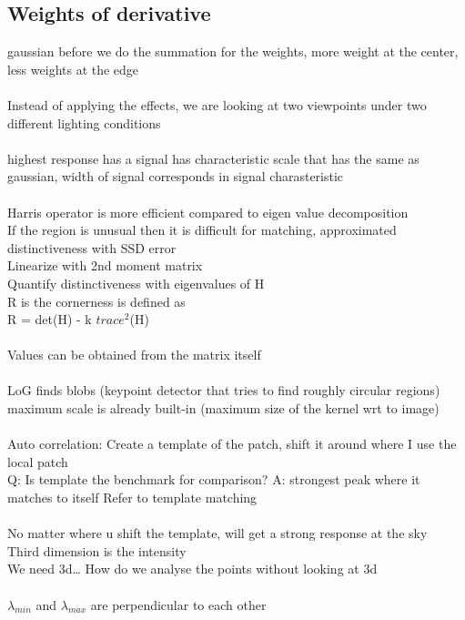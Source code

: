 \documentclass[11pt]{article}
\begin{document}
\subsection*{Weights of derivative}
gaussian before we do the summation for the weights, more weight at the center, less weights at the edge
\\
\\
Instead of applying the effects, we are looking at two viewpoints under two different lighting conditions
\\\\
highest response has a signal has characteristic scale that has the same as gaussian, width of signal corresponds in signal charasteristic
	\\\\
	Harris operator is more efficient compared to eigen value decomposition\\
	If the region is unusual then it is difficult for matching, approximated distinctiveness with SSD error
	\\
	Linearize with 2nd moment matrix\\
	Quantify distinctiveness with eigenvalues of H 
	\\
	R is the cornerness is defined as \\
	R = det(H) - k $trace^{2}$(H)
	\\\\
	Values can be obtained from the matrix itself
	\\\\
LoG finds blobs (keypoint detector that tries to find roughly circular regions)
maximum scale is already built-in
(maximum size of the kernel wrt to image)
\\\\
Auto correlation: Create a template of the patch, shift it around where I use the local patch
\\
Q: Is template the benchmark for comparison?
A: strongest peak where it matches to itself
Refer to template matching\\
\\
No matter where u shift the template, will get a strong response at the sky\\
Third dimension is the intensity
\\
We need 3d… How do we analyse the points without looking at 3d\\
\\
$\lambda_{min}$ and $\lambda_{max}$  are perpendicular to each other\\
\\
\end{document}
